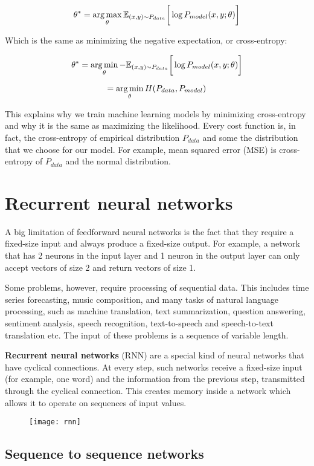  \[ \theta^{*} = \operatorname*{arg\,max}_{\theta} \mathbb{E}_{(x,y) \sim P_{data}} \bigg[\log P_{model}(x, y;\theta)\bigg] \]

 Which is the same as minimizing the negative expectation, or cross-entropy:

 \[ \theta^{*} = \operatorname*{arg\,min}_{\theta} - \mathbb{E}_{(x,y) \sim P_{data}} \bigg[\log P_{model}(x, y;\theta)\bigg] \]

  \[ = \operatorname*{arg\,min}_{\theta} H(P_{data}, P_{model}) \]

This explains why we train machine learning models by minimizing cross-entropy and why it is the same as maximizing the likelihood. Every cost function is, in fact, the cross-entropy of empirical distribution $P_{data}$ and some the distribution that we choose for our model. For example, mean squared error (MSE) is cross-entropy of $P_{data}$ and the normal distribution.

\section{Recurrent neural networks}
\label{sec:Background-RNN}

A big limitation of feedforward neural networks is the fact that they require a fixed-size input and always produce a fixed-size output. For example, a network that has 2 neurons in the input layer and 1 neuron in the output layer can only accept vectors of size 2 and return vectors of size 1.

Some problems, however, require processing of sequential data. This includes time series forecasting, music composition, and many tasks of natural language processing, such as machine translation, text summarization, question answering, sentiment analysis, speech recognition, text-to-speech and speech-to-text translation etc. The input of these problems is a sequence of variable length.

\textbf{Recurrent neural networks} (RNN) are a special kind of neural networks that have cyclical connections. At every step, such networks receive a fixed-size input (for example, one word) and the information from the previous step, transmitted through the cyclical connection. This creates memory inside a network which allows it to operate on sequences of input values.

\begin{figure}[H]
    \label{fig:rnn}
    \centering
    \texttt{[image: rnn]}
\end{figure}

\subsection{Sequence to sequence networks}
\label{sec:Background-seq2seq}

